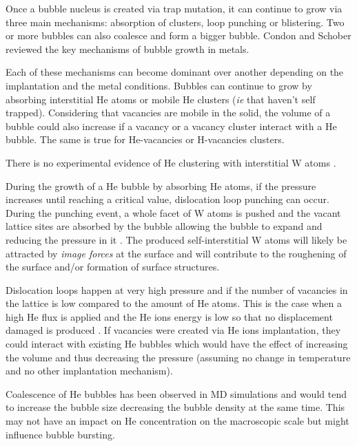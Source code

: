 Once a bubble nucleus is created via trap mutation, it can continue to grow via three main mechanisms: absorption of clusters, loop punching or blistering.
Two or more bubbles can also coalesce and form a bigger bubble.
Condon and Schober  reviewed the key mechanisms of bubble growth in metals.

Each of these mechanisms can become dominant over another depending on the implantation and the metal conditions. 
Bubbles can continue to grow by absorbing interstitial He atoms or mobile He clusters (\textit{ie} that haven't self trapped).
Considering that vacancies are mobile in the solid, the volume of a bubble could also increase if a vacancy or a vacancy cluster interact with a He bubble.
The same is true for He-vacancies or H-vacancies clusters.

There is no experimental evidence of He clustering with interstitial W atoms .

During the growth of a He bubble by absorbing He atoms, if the pressure increases until reaching a critical value, dislocation loop punching can occur.
During the punching event, a whole facet of W atoms is pushed and the vacant lattice sites are absorbed by the bubble allowing the bubble to expand and reducing the pressure in it .
The produced self-interstitial W atoms will likely be attracted by \textit{image forces} at the surface and will contribute to the roughening of the surface and/or formation of surface structures.

Dislocation loops happen at very high pressure and if the number of vacancies in the lattice is low compared to the amount of He atoms.
This is the case when a high He flux is applied and the He ions energy is low so that no displacement damaged is produced \cite{sefta_surface_2013}.
If vacancies were created via He ions implantation, they could interact with existing He bubbles which would have the effect of increasing the volume and thus decreasing the pressure (assuming no change in temperature and no other implantation mechanism).

Coalescence of He bubbles has been observed in MD simulations  and would tend to increase the bubble size decreasing the bubble density at the same time.
This may not have an impact on He concentration on the macroscopic scale but might influence bubble bursting.


